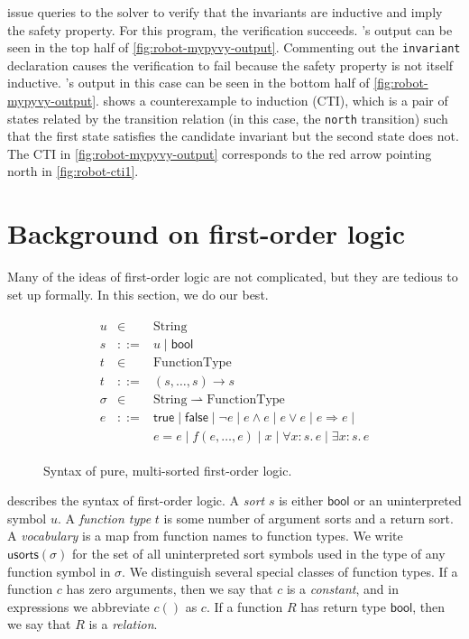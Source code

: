   issue queries to the solver to verify that the invariants
  are inductive and imply the safety property.
For this program, the verification succeeds.
\mypyvy's output can be seen in
  the top half of \cref{fig:robot-mypyvy-output}.
Commenting out the \lstinline[language=mypyvy]{invariant} declaration
  causes the verification to fail
  because the safety property is not itself inductive.
\mypyvy's output in this case can be seen in
  the bottom half of \cref{fig:robot-mypyvy-output}.
\mypyvy shows a counterexample to induction (CTI),
  which is a pair of states related by the transition relation
  (in this case, the \texttt{north} transition)
  such that the first state satisfies the candidate invariant
  but the second state does not.
The CTI in \cref{fig:robot-mypyvy-output} corresponds
  to the red arrow pointing north in \cref{fig:robot-cti1}.

\section{Background on first-order logic}

Many of the ideas of first-order logic are not complicated,
  but they are tedious to set up formally.
In this section, we do our best.

\begin{figure}[t]
  \begin{gather*}
  \begin{array}{rcl}
    u &\in& \mathrm{String}\\
    s &::=& u \mid \mathsf{bool}\\
    t &\in& \mathrm{FunctionType}\\
    t &::=& (s,\dots,s) \to s\\
    \sigma &\in&  \mathrm{String} \rightharpoonup \mathrm{FunctionType}\\
    e &::=& \mathsf{true} \mid \mathsf{false} \mid \lnot e\mid e\land e\mid e\lor e \mid e \Rightarrow e \mid \\
      &   & e = e \mid f(e,\dots,e) \mid x \mid \forall x : s.\, e \mid \exists x : s.\, e
  \end{array}
  \end{gather*}
  \caption{Syntax of pure, multi-sorted first-order logic.}
  \label{fig:fol-syntax}
\end{figure}


 describes the syntax of first-order logic.
A \emph{sort} $s$ is either $\mathsf{bool}$ or an uninterpreted symbol $u$.
A \emph{function type} $t$ is some number of argument sorts and a return sort.
A \emph{vocabulary} is a map from function names to function types.
We write $\mathsf{usorts}(\sigma)$ for the set of all uninterpreted sort
  symbols used in the type of any function symbol in $\sigma$.
We distinguish several special classes of function types.
If a function $c$ has zero arguments,
  then we say that $c$ is a \emph{constant},
  and in expressions we abbreviate $c()$ as $c$.
If a function $R$ has return type $\mathsf{bool}$,
  then we say that $R$ is a \emph{relation}.

